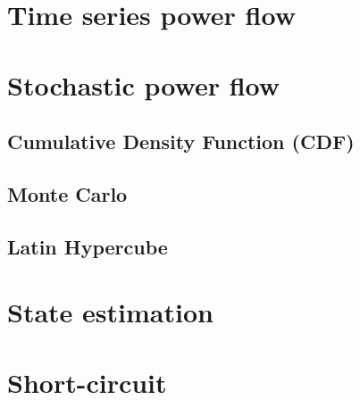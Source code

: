 \documentclass{tufte-book}
\begin{document}
\chapter{Time series power flow}



\chapter{Stochastic power flow}

\section{Cumulative Density Function (CDF)}


\section{Monte Carlo}


\section{Latin Hypercube}




\chapter{State estimation}



\chapter{Short-circuit}





\backmatter





\printindex
\end{document}
